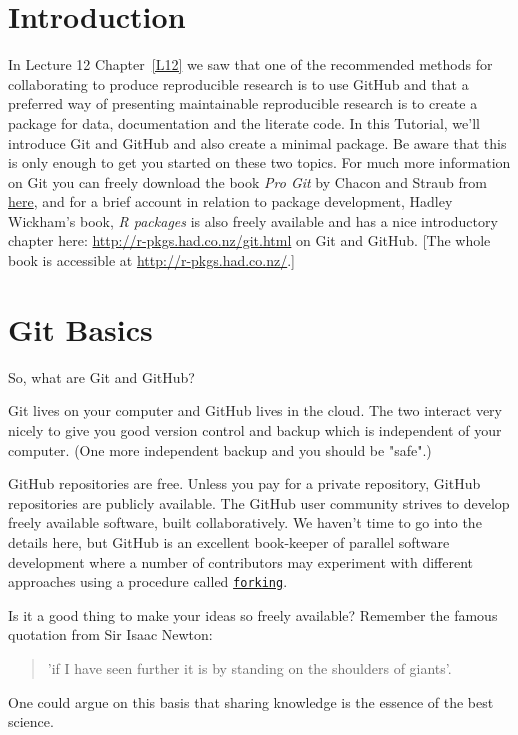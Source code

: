 \documentclass[titlepage]{book}\usepackage{knitr}
\begin{document}
\section{Introduction}

In Lecture 12 Chapter~\ref{L12} we saw that one of the recommended methods for collaborating to produce reproducible research is to use GitHub and that a preferred way of presenting maintainable reproducible research is to create a package for data, documentation and the literate code.  In this Tutorial, we'll introduce Git and GitHub and also create a minimal package.  Be aware that this is only enough to get you started on these two topics.  For much more information on Git you can freely download the book \emph{Pro Git}\cite{Chacon2014} by Chacon and Straub from \href{http://git-scm.com/book/en/v2}{here}, and for a brief account in relation to package development, Hadley Wickham's book, \emph{R packages}\cite{Wickham2015b} is also freely available and has a nice introductory chapter here: \href{http://r-pkgs.had.co.nz/git.html}{http://r-pkgs.had.co.nz/git.html} on Git and GitHub.  [The whole book is accessible at \href{http://r-pkgs.had.co.nz/}{http://r-pkgs.had.co.nz/}.]

\section{Git Basics}

So, what are Git and GitHub?

Git lives on your computer and GitHub lives in the cloud. The two interact very nicely to give you good version control and backup which is independent of your computer. (One more independent backup and you should be "safe".) 

GitHub repositories are free.  Unless you pay for a private repository, GitHub repositories are publicly available. The GitHub user community strives to develop freely available software, built collaboratively. We haven't time to go into the details here, but GitHub is an excellent book-keeper of parallel software development where a number of contributors may experiment with  different approaches using a procedure called \href{https://en.wikipedia.org/wiki/Fork_(software_development)}{\texttt{forking}}. 

Is it a good thing to make your ideas so freely available? Remember the famous quotation from Sir Isaac Newton:
\begin{quote}
 'if I have seen further it is by standing on the shoulders of giants'.
 \end{quote}
One could argue on this basis that sharing knowledge is the essence of the best science. 
\end{document}
